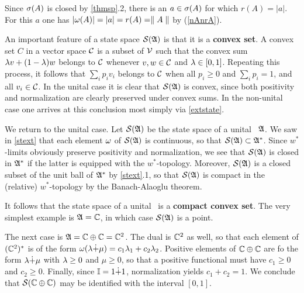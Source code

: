 Since $\sigma(A)$ is closed by \ref{thmsp}.2, there is an $a\in\sigma(A)$
for which $r(A)=|a|$. For this $a$ one has $|\omega(A)|=|a|=r(A)=\parallel A\parallel$
by (\ref{nAnrA}).  \enp

An important feature of a state space ${\cal S}({\frak A})$ is that it is a {\bf
convex set}.  A convex set $C$ in a vector space ${\cal C}$ is a
subset of ${\cal V}$ such that the convex sum $\lambda v +(1-\lambda)w$ belongs to
$\cal C$ whenever $v,w\in {\cal C}$ and $\lambda\in [0,1]$. Repeating this
process, it follows that $\sum_i p_i v_i$ belongs to $\cal C$ when all
$p_i\geq 0$ and $\sum_i p_i=1$, and all $v_i\in{\cal C}$.  In the
unital case it is clear that ${\cal S}({\frak A})$ is convex, since both positivity
and normalization are clearly preserved under convex sums. In the
non-unital case one arrives at this conclusion most simply via
\ref{extstate}.

We return to the unital case.  Let ${\cal S}({\frak A})$ be the state space of a
unital \ca\ ${\frak A}$. We saw in \ref{stext} that each element $\omega$ of
${\cal S}({\frak A})$ is continuous, so that ${\cal S}({\frak A})\subset{\frak A}^*$.  Since $w^*$-limits
obviously preserve positivity and normalization, we see that ${\cal S}({\frak A})$ is
closed in ${\frak A}^*$ if the latter is equipped with the
$w^*$-topology. Moreover, ${\cal S}({\frak A})$ is a closed subset of the unit ball of
${\frak A}^*$ by \ref{stext}.1, so that ${\cal S}({\frak A})$ is compact in the (relative)
$w^*$-topology by the Banach-Alaoglu theorem.

It follows that the state space of a unital \ca\ is a {\bf compact
convex set}.  The very simplest example is ${\frak A}={\Bbb C}$, in which case
${\cal S}({\frak A})$ is a point.

The next case is ${\frak A}={\Bbb C}\oplus{\Bbb C}={\Bbb C}^2$. The dual is ${\Bbb C}^2$ as well, so
that each element of $({\Bbb C}^2)^*$ is of the form $\omega(\lambda\dot{+}\mu)=
c_1\lambda_1+c_2\lambda_2$. Positive elements of ${\Bbb C}\oplus{\Bbb C}$ are fo the form
$\lambda\dot{+}\mu$ with $\lambda\geq 0$ and $\mu\geq 0$, so that a positive
functional must have $c_1\geq 0$ and $c_2\geq 0$. Finally, since
${\Bbb I}=1\dot{+}1$, normalization yields $c_1+c_2=1$. We conclude that
${\cal S}({\Bbb C}\oplus{\Bbb C})$ may be identified with the interval $[0,1]$.

